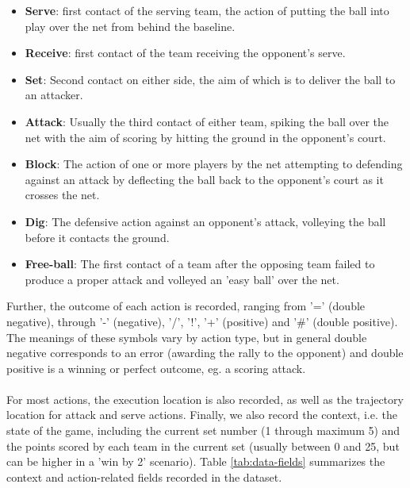 \documentclass{sfuthesis}
\begin{document}
	\begin{itemize}
		\item \textbf{Serve}: first contact of the serving team, the action of putting the ball into play over the net from behind the baseline.
		\item \textbf{Receive}: first contact of the team receiving the opponent's serve.
		\item \textbf{Set}: Second contact on either side, the aim of which is to deliver the ball to an attacker.
		\item \textbf{Attack}: Usually the third contact of either team, spiking the ball over the net with the aim of scoring by hitting the ground in the opponent's court.
		\item \textbf{Block}: The action of one or more players by the net attempting to defending against an attack by deflecting the ball back to the opponent's court as it crosses the net.
		\item \textbf{Dig}: The defensive action against an opponent's attack, volleying the ball before it contacts the ground.
		\item \textbf{Free-ball}: The first contact of a team after the opposing team failed to produce a proper attack and volleyed an 'easy ball' over the net.
	\end{itemize}
	Further, the outcome of each action is recorded, ranging from '=' (double negative), through '-' (negative), '/', '!', '+' (positive) and '\#' (double positive). The meanings of these symbols vary by action type, but in general double negative corresponds to an error (awarding the rally to the opponent) and double positive is a winning or perfect outcome, eg. a scoring attack.\\\\
	For most actions, the execution location is also recorded, as well as the trajectory location for attack and serve actions. Finally, we also record the context, i.e. the state of the game, including the current set number (1 through maximum 5) and the points scored by each team in the current set (usually between 0 and 25, but can be higher in a 'win by 2' scenario). Table \ref{tab:data-fields} summarizes the context and action-related fields recorded in the dataset.
\end{document}
